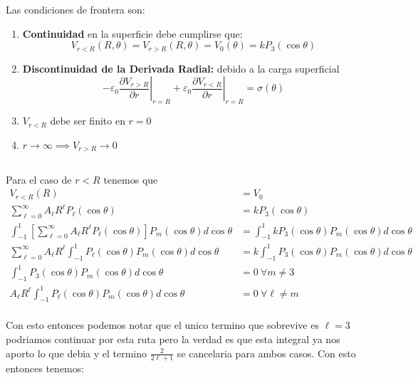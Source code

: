 \documentclass{report}
\begin{document}
\chapter{}

\section{}

Las condiciones de frontera son:
\begin{enumerate}
	\item \textbf{Continuidad} en la superficie debe cumplirse que:
		\[
			V_{r < R}(R, \theta) = V_{r > R}(R, \theta) = V_0(\theta) = k P_3(\cos\theta)
		\]
	\item \textbf{Discontinuidad de la Derivada Radial:} debido a la carga superficial
		\[
			-\varepsilon_0 \left.\frac{\partial V_{r > R}}{\partial r}\right|_{r=R} + \varepsilon_0 \left.\frac{\partial V_{r < R}}{\partial r}\right|_{r=R} = \sigma(\theta)
		\]
	\item $V_{r < R}$ debe ser finito en $r = 0$
	\item $r \to \infty \implies V_{r > R} \to 0$ 
\end{enumerate}

\section{}

Para el caso de $r < R$ tenemos que
\begin{align*}
	V_{r < R}(R) &= V_0\\
	\sum_{\ell = 0}^\infty A_\ell R^\ell P_\ell(\cos\theta) &= k P_3(\cos\theta)\\
	\int_{-1}^{1}\left[\sum_{\ell = 0}^\infty A_\ell R^\ell P_\ell(\cos\theta)\right]P_m(\cos\theta)d\cos\theta &= \int_{-1}^1 k P_3(\cos\theta) P_m(\cos\theta) d\cos\theta\\
	\sum_{\ell = 0}^\infty A_\ell R^\ell \int_{-1}^{1} P_\ell(\cos\theta)P_m(\cos\theta)d\cos\theta &= k \int_{-1}^1 P_3(\cos\theta) P_m(\cos\theta) d\cos\theta\\
	\int_{-1}^1 P_3(\cos\theta) P_m(\cos\theta) d\cos\theta &= 0\ \forall m \neq 3\\
	A_\ell R^\ell \int_{-1}^{1} P_\ell(\cos\theta)P_m(\cos\theta)d\cos\theta &= 0\ \forall \ell \neq m \\
\end{align*}

Con esto entonces podemos notar que el unico termino que sobrevive es $\ell = 3$ podriamos continuar por esta ruta pero la verdad es que esta integral ya nos aporto lo que debia y el termino $\frac{2}{2\ell + 1}$ se cancelaria para ambos casos. Con esto entonces tenemos:
\end{document}
